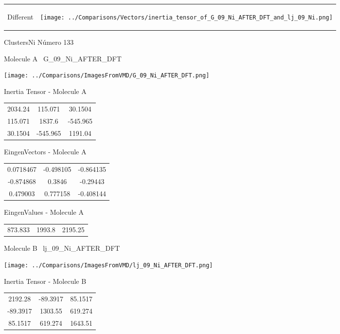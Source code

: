\vtab[-5mm]
\begin{tabular}{*{2}{m{}}}
\begin{center}
\textcolor{NavyBlue}{\Large Different}
\end{center}
&
\begin{center}
\texttt{[image: ../Comparisons/Vectors/inertia\_tensor\_of\_G\_09\_Ni\_AFTER\_DFT\_and\_lj\_09\_Ni.png]}
\end{center}
\end{tabular}

 \newpage

\vtab[-3cm]
\begin{center}
{\large ClustersNi \tab Número 133}
\end{center}
\begin{multicols}{2}
\begin{center}

Molecule A \
G\_09\_Ni\_AFTER\_DFT

\texttt{[image: ../Comparisons/ImagesFromVMD/G\_09\_Ni\_AFTER\_DFT.png]}

Inertia Tensor - Molecule A \\
\begin{tabular}{|c c c|}
2034.24	 & 	115.071	 & 	30.1504	 \\
115.071	 & 	1837.6	 & 	-545.965	 \\
30.1504	 & 	-545.965	 & 	1191.04
\end{tabular}

\vtab
 EingenVectors - Molecule A     \\
\begin{tabular}{|c c c|}
0.0718467	 & 	-0.498105	 & 	-0.864135	 \\
-0.874868	 & 	0.3846	 & 	-0.29443	 \\
0.479003	 & 	0.777158	 & 	-0.408144
\end{tabular}

\vtab
 EingenValues - Molecule A     \\
\begin{tabular}{|c c c|}
873.833	 & 	1993.8	 & 	2195.25	 \\
\end{tabular}
\columnbreak

Molecule B \
lj\_09\_Ni\_AFTER\_DFT

\texttt{[image: ../Comparisons/ImagesFromVMD/lj\_09\_Ni\_AFTER\_DFT.png]}

Inertia Tensor - Molecule B \\
\begin{tabular}{|c c c|}
2192.28	 & 	-89.3917	 & 	85.1517	 \\
-89.3917	 & 	1303.55	 & 	619.274	 \\
85.1517	 & 	619.274	 & 	1643.51
\end{tabular}


\end{center}
\end{multicols}
